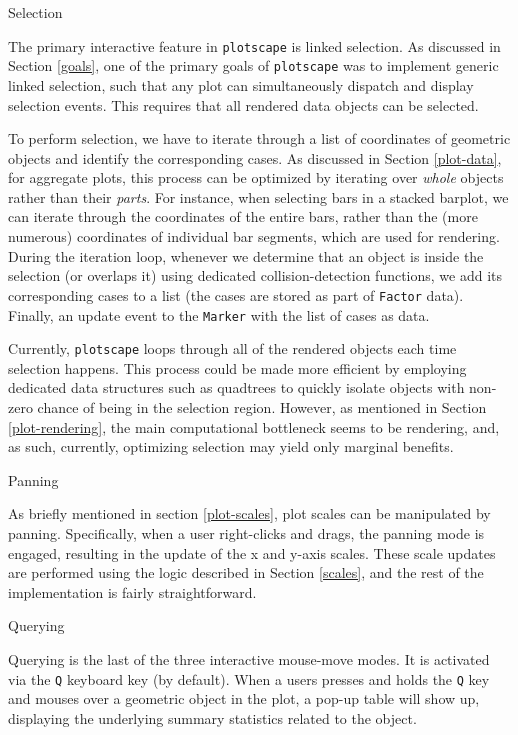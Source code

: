 \documentclass[
  openany]{book}
\theoremstyle{definition}
\theoremstyle{definition}
\theoremstyle{definition}
\theoremstyle{definition}
\theoremstyle{remark}
\begin{document}
Selection

The primary interactive feature in \texttt{plotscape} is linked selection. As discussed in Section \ref{goals}, one of the primary goals of \texttt{plotscape} was to implement generic linked selection, such that any plot can simultaneously dispatch and display selection events. This requires that all rendered data objects can be selected.

To perform selection, we have to iterate through a list of coordinates of geometric objects and identify the corresponding cases. As discussed in Section \ref{plot-data}, for aggregate plots, this process can be optimized by iterating over \emph{whole} objects rather than their \emph{parts}. For instance, when selecting bars in a stacked barplot, we can iterate through the coordinates of the entire bars, rather than the (more numerous) coordinates of individual bar segments, which are used for rendering. During the iteration loop, whenever we determine that an object is inside the selection (or overlaps it) using dedicated collision-detection functions, we add its corresponding cases to a list (the cases are stored as part of \texttt{Factor} data). Finally, an update event to the \texttt{Marker} with the list of cases as data.

Currently, \texttt{plotscape} loops through all of the rendered objects each time selection happens. This process could be made more efficient by employing dedicated data structures such as quadtrees to quickly isolate objects with non-zero chance of being in the selection region. However, as mentioned in Section \ref{plot-rendering}, the main computational bottleneck seems to be rendering, and, as such, currently, optimizing selection may yield only marginal benefits.

Panning

As briefly mentioned in section \ref{plot-scales}, plot scales can be manipulated by panning. Specifically, when a user right-clicks and drags, the panning mode is engaged, resulting in the update of the x and y-axis scales. These scale updates are performed using the logic described in Section \ref{scales}, and the rest of the implementation is fairly straightforward.

Querying

Querying is the last of the three interactive mouse-move modes. It is activated via the \texttt{Q} keyboard key (by default). When a users presses and holds the \texttt{Q} key and mouses over a geometric object in the plot, a pop-up table will show up, displaying the underlying summary statistics related to the object.
\end{document}
